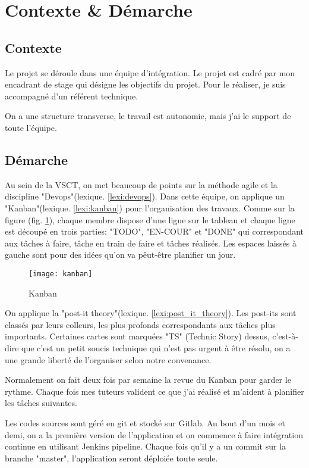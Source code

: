 \section{Contexte \& Démarche}
\subsection{Contexte}
Le projet se déroule dans une équipe d'intégration.
Le projet est cadré par mon encadrant de stage qui désigne les objectifs du projet.
Pour le réaliser, je suis accompagné d'un référent technique.

On a une structure transverse, le travail est autonomie, mais j'ai le support de toute l'équipe.

\subsection{Démarche}
Au sein de la VSCT, on met beaucoup de points sur la méthode agile et la discipline "Devops"(lexique. \ref{lexi:devops}).
Dans cette équipe, on applique un "Kanban"(lexique. \ref{lexi:kanban}) pour l'organisation des travaux.
Comme sur la figure (fig. \ref{fig:kanban}), chaque membre dispose d'une ligne sur le tableau et chaque ligne est découpé en trois parties: "TODO", "EN-COUR" et "DONE" qui correspondant aux tâches à faire, tâche en train de faire et tâches réalisés.
Les espaces laissés à gauche sont pour des idées qu'on va pêut-être planifier un jour.

\begin{figure}[ht]
\centering
\texttt{[image: kanban]}
\caption{Kanban}
\label{fig:kanban}
\end{figure}

On applique la "post-it theory"(lexique. \ref{lexi:post_it_theory}).
Les post-its sont classés par leurs colleurs, les plus profonds correspondants aux tâches plus importants.
Certaines cartes sont marquées "TS" (Technic Story) dessus, c'est-à-dire que c'est un petit soucis technique qui n'est pas urgent à être résolu, on a une grande liberté de l'organiser selon notre convenance.

Normalement on fait  deux fois par semaine la revue du Kanban pour garder le rythme.
Chaque fois mes tuteurs valident ce que j'ai réalisé et m'aident à planifier les tâches suivantes.

Les codes sources sont géré en git et stocké sur Gitlab. Au bout d'un mois et demi, on a la première version de l'application et on commence à faire intégration continue en utilisant Jenkins pipeline.
Chaque fois qu'il y a un commit sur la branche "master", l'application seront déploiée toute seule.

\clearpage
